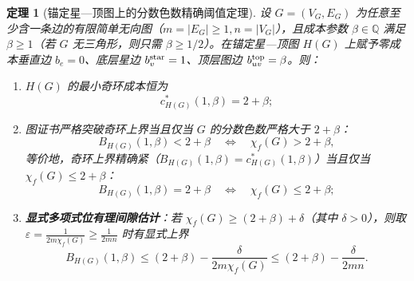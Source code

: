 \documentclass[11pt,a4paper]{ctexart}
\newtheorem{theorem}{定理}[section]
\theoremstyle{definition}
\newcommand{\QQ}{\mathbb Q}
\newcommand{\1}{\boldsymbol 1}
\newcommand{\0}{\boldsymbol 0}
\newcommand{\chif}{\chi_f}
\begin{document}
\begin{theorem}[锚定星—顶图上的分数色数精确阈值定理]\label{thm:main_threshold}
设 $G=(V_G,E_G)$ 为任意至少含一条边的有限简单无向图（$m=|E_G|\ge 1,n=|V_G|$），且成本参数 $\beta\in\QQ$ 满足 $\beta\ge 1$（若 $G$ 无三角形，则只需 $\beta\ge 1/2$）。在锚定星—顶图 $H(G)$ 上赋予零成本垂直边 $b_e=0$、底层星边 $b_v^{\rm star}=1$、顶层图边 $b_{uv}^{\rm top}=\beta$。则：
\begin{enumerate}[label=(\arabic*)]
\item $H(G)$ 的最小奇环成本恒为
\begin{equation}\label{eq:HG_cstar}
 c_{H(G)}^*(1,\beta)=2+\beta;
\end{equation}
\item 图证书严格突破奇环上界当且仅当 $G$ 的分数色数严格大于 $2+\beta$：
\begin{equation}\label{eq:main_iff}
 \boxed{B_{H(G)}(1,\beta) < 2+\beta \quad\Longleftrightarrow\quad \chif(G) > 2+\beta,}
\end{equation}
等价地，奇环上界精确紧（$B_{H(G)}(1,\beta)=c_{H(G)}^*(1,\beta)$）当且仅当 $\chif(G)\le 2+\beta$：
\begin{equation}\label{eq:main_eq}
 \boxed{B_{H(G)}(1,\beta) = 2+\beta \quad\Longleftrightarrow\quad \chif(G) \le 2+\beta;}
\end{equation}
\item \textbf{显式多项式位有理间隙估计}：若 $\chif(G)\ge (2+\beta)+\delta$（其中 $\delta>0$），则取 $\varepsilon=\frac{1}{2m\chif(G)}\ge \frac{1}{2mn}$ 时有显式上界
\begin{equation}\label{eq:explicit_gap}
 \boxed{B_{H(G)}(1,\beta) \le (2+\beta) - \frac{\delta}{2m\chif(G)} \le (2+\beta) - \frac{\delta}{2mn}.}
\end{equation}
\end{enumerate}
\end{theorem}
\end{document}

